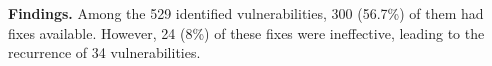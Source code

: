 
\begin{tcolorbox}
\textbf{Findings.} Among the 529 identified vulnerabilities, 300 (56.7\%) of them had fixes available. However, 24 (8\%) of these fixes were ineffective, leading to the recurrence of 34 vulnerabilities. 
\end{tcolorbox}
